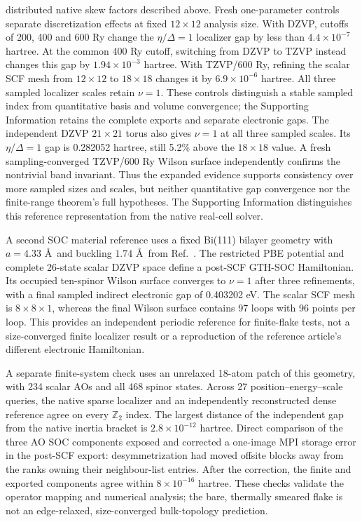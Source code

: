 distributed native skew factors described above.
Fresh one-parameter controls separate discretization effects at fixed
$12\times12$ analysis size. With DZVP, cutoffs of 200, 400 and
600 Ry change the $\eta/\Delta=1$ localizer gap by less than
$4.4\times10^{-7}$ hartree. At the common 400 Ry cutoff, switching
from DZVP to TZVP instead changes this gap by
$1.94\times10^{-3}$ hartree. With TZVP/600 Ry, refining the scalar
SCF mesh from $12\times12$ to $18\times18$ changes it by
$6.9\times10^{-6}$ hartree. All three sampled localizer scales
retain $\nu=1$. These controls distinguish a stable sampled index
from quantitative basis and volume convergence; the Supporting
Information retains the complete exports and separate electronic gaps.
The independent DZVP $21\times21$ torus also gives $\nu=1$
at all three sampled scales. Its $\eta/\Delta=1$ gap is
0.282052 hartree, still 5.2\% above the $18\times18$ value.
A fresh sampling-converged TZVP/600 Ry Wilson surface independently
confirms the nontrivial band invariant.
Thus the expanded evidence supports consistency over
more sampled sizes and scales, but neither quantitative gap
convergence nor the finite-range theorem's full hypotheses.
The Supporting Information distinguishes this reference
representation from the native real-cell solver.

A second SOC material reference uses a fixed Bi(111) bilayer geometry
with $a=4.33$ \AA\ and buckling $1.74$ \AA\ from
Ref.~\cite{Li2021Bismuth}. The restricted PBE potential and complete
26-state scalar DZVP space define a post-SCF GTH-SOC Hamiltonian.
Its occupied ten-spinor Wilson surface converges to $\nu=1$ after
three refinements, with a final sampled indirect electronic gap of
0.403202 eV. The scalar SCF mesh is $8\times8\times1$, whereas
the final Wilson surface contains 97 loops with 96 points per loop.
This provides an independent periodic reference for finite-flake
tests, not a size-converged finite localizer result or a reproduction
of the reference article's different electronic Hamiltonian.

A separate finite-system check uses an unrelaxed 18-atom patch of
this geometry, with 234 scalar AOs and all 468 spinor states. Across
27 position--energy--scale queries, the native sparse localizer and
an independently reconstructed dense reference agree on every
$\mathbb Z_2$ index. The largest distance of the independent gap
from the native inertia bracket is $2.8\times10^{-12}$ hartree.
Direct comparison of the three AO SOC components exposed and
corrected a one-image MPI storage error in the post-SCF export:
desymmetrization had moved offsite blocks away from the ranks
owning their neighbour-list entries. After the correction, the
finite and exported components agree within $8\times10^{-16}$
hartree. These checks validate the operator mapping and numerical
analysis; the bare, thermally smeared flake is not an edge-relaxed,
size-converged bulk-topology prediction.

